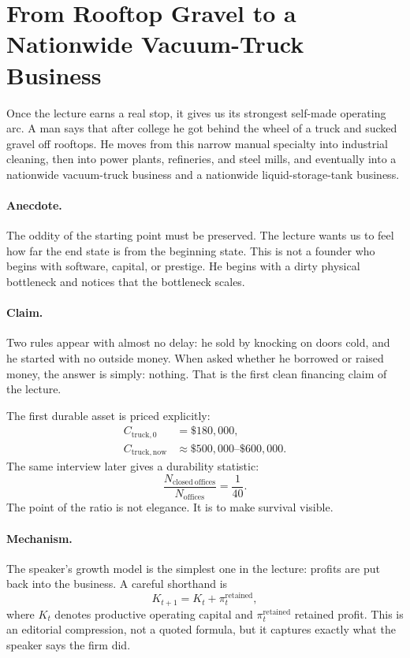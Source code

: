 \section{From Rooftop Gravel to a Nationwide Vacuum-Truck Business}

Once the lecture earns a real stop, it gives us its strongest self-made operating arc. A man says that after college he got behind the wheel of a truck and sucked gravel off rooftops. He moves from this narrow manual specialty into industrial cleaning, then into power plants, refineries, and steel mills, and eventually into a nationwide vacuum-truck business and a nationwide liquid-storage-tank business.

\paragraph{Anecdote.} The oddity of the starting point must be preserved. The lecture wants us to feel how far the end state is from the beginning state. This is not a founder who begins with software, capital, or prestige. He begins with a dirty physical bottleneck and notices that the bottleneck scales.

\paragraph{Claim.} Two rules appear with almost no delay: he sold by knocking on doors cold, and he started with no outside money. When asked whether he borrowed or raised money, the answer is simply: nothing. That is the first clean financing claim of the lecture.

The first durable asset is priced explicitly:
\begin{align}
C_{\mathrm{truck},0} &= \$180{,}000,\\
C_{\mathrm{truck},\mathrm{now}} &\approx \$500{,}000\text{--}\$600{,}000.
\end{align}
The same interview later gives a durability statistic:
\begin{equation}
\frac{N_{\mathrm{closed\ offices}}}{N_{\mathrm{offices}}}=\frac{1}{40}.
\end{equation}
The point of the ratio is not elegance. It is to make survival visible.

\paragraph{Mechanism.} The speaker's growth model is the simplest one in the lecture: profits are put back into the business. A careful shorthand is
\begin{equation}
K_{t+1}=K_t+\pi_t^{\mathrm{retained}},
\end{equation}
where \(K_t\) denotes productive operating capital and \(\pi_t^{\mathrm{retained}}\) retained profit. This is an editorial compression, not a quoted formula, but it captures exactly what the speaker says the firm did.

